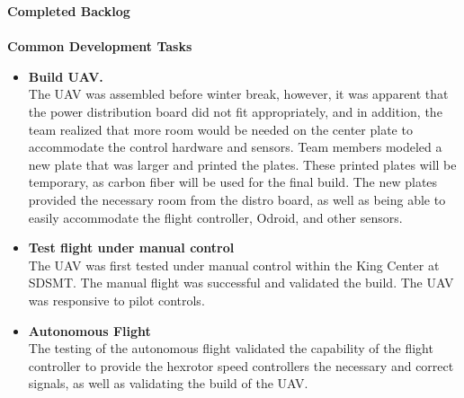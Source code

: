 \vspace{5mm}
\noindent\Large{\textbf{Completed Backlog}}\\
\vspace{2mm}\\
\large{\textbf{Common Development Tasks}}
\normalsize
\begin{itemize}
\item \textbf{Build UAV.}\\
The UAV was assembled before winter break, however, it was apparent that the power distribution board did not fit appropriately, and in addition, the team realized that more room would be needed on the center plate to accommodate the control hardware and sensors. Team members modeled a new plate that was larger and printed the plates. These printed plates will be temporary, as carbon fiber will be used for the final build. The new plates provided the necessary room from the distro board, as well as being able to easily accommodate the flight controller, Odroid, and other sensors.\\
\item \textbf{Test flight under manual control} \\
The UAV was first tested under manual control within the King Center at SDSMT. The manual flight was successful and validated the build. The UAV was responsive to pilot controls.
\item \textbf{Autonomous Flight} \\
The testing of the autonomous flight validated the capability of the flight controller to provide the hexrotor speed controllers the necessary and correct signals, as well as validating the build of the UAV.


\end{itemize}
